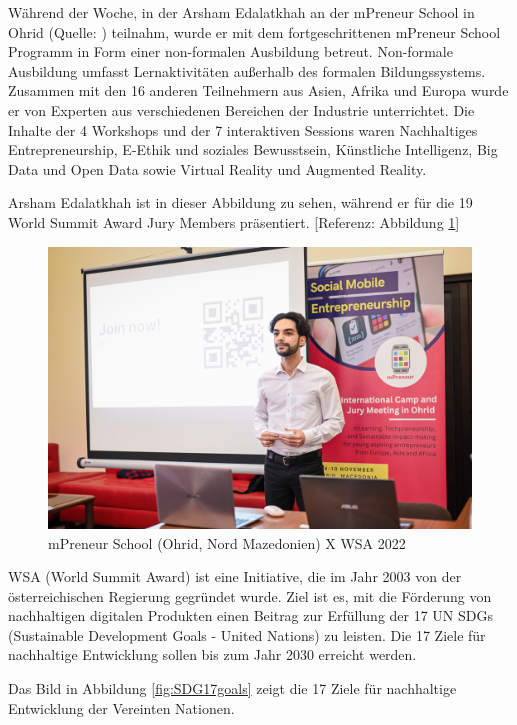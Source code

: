 Während der Woche, in der Arsham Edalatkhah an der mPreneur School in Ohrid (Quelle: \cite{mpreneur_training}) teilnahm, wurde er mit dem fortgeschrittenen mPreneur School Programm in Form einer non-formalen Ausbildung betreut. Non-formale Ausbildung umfasst Lernaktivitäten außerhalb des formalen Bildungssystems. Zusammen mit den 16 anderen Teilnehmern aus Asien, Afrika und Europa wurde er von Experten aus verschiedenen Bereichen der Industrie unterrichtet. Die Inhalte der 4 Workshops und der 7 interaktiven Sessions waren Nachhaltiges Entrepreneurship, E-Ethik und soziales Bewusstsein, Künstliche Intelligenz, Big Data und Open Data sowie Virtual Reality und Augmented Reality.

Arsham Edalatkhah ist in dieser Abbildung zu sehen, während er für die 19 World Summit Award Jury Members präsentiert. [Referenz: Abbildung \ref{fig:mPreneurSchool}]

\begin{figure}[H]
    \centering
    \includegraphics[width=1\textwidth]{pics/mPreneur-2022.JPG}
    \caption{mPreneur School (Ohrid, Nord Mazedonien) X WSA 2022}
    \label{fig:mPreneurSchool}
\end{figure}

WSA (World Summit Award) ist eine Initiative, die im Jahr 2003 von der österreichischen Regierung gegründet wurde. Ziel ist es, mit die Förderung von nachhaltigen digitalen Produkten einen Beitrag zur Erfüllung der 17 UN SDGs (Sustainable Development Goals - United Nations) zu leisten. Die 17 Ziele für nachhaltige Entwicklung \cite{un-sdgs} sollen bis zum Jahr 2030 erreicht werden.

Das Bild in Abbildung \ref{fig:SDG17goals} zeigt die 17 Ziele für nachhaltige Entwicklung der Vereinten Nationen.

